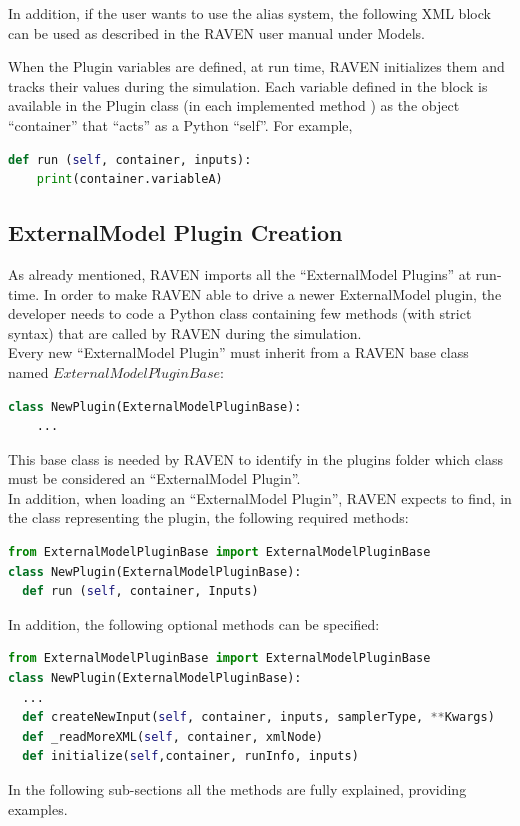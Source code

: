In addition, if the user wants to use the alias system, the following XML block can be used as
described in the RAVEN user manual under Models.

When the Plugin variables are defined, at run time, RAVEN initializes
them and tracks their values during the simulation.
%
Each variable defined in the  block is available in the
Plugin class (in each implemented method ) as the object ``container'' that ``acts''
as a Python ``self''. For example,
\begin{lstlisting}[language=python]
  def run (self, container, inputs):
    print(container.variableA)
\end{lstlisting}

\subsection{ExternalModel Plugin Creation}
\label{subsec:externalModelPluginCreation}
As already mentioned, RAVEN imports all the ``ExternalModel Plugins'' at run-time.
In order to make RAVEN
able to drive a newer ExternalModel plugin, the developer needs to code a Python class
containing few methods (with strict syntax) that are called by RAVEN during the simulation.
\\ Every new ``ExternalModel Plugin'' must inherit from a RAVEN base class named
$ExternalModelPluginBase$:
\begin{lstlisting}[language=python]
  class NewPlugin(ExternalModelPluginBase):
    ...
\end{lstlisting}
This base class is needed by RAVEN to identify in the plugins folder which class must
be considered an  ``ExternalModel Plugin''.
\\ In addition, when loading an ``ExternalModel Plugin'', RAVEN expects to find, in the class representing the plugin,
 the following required methods:
\begin{lstlisting}[language=python]
from ExternalModelPluginBase import ExternalModelPluginBase
class NewPlugin(ExternalModelPluginBase):
  def run (self, container, Inputs)
\end{lstlisting}
In addition, the following optional methods can be specified:
\begin{lstlisting}[language=python]
from ExternalModelPluginBase import ExternalModelPluginBase
class NewPlugin(ExternalModelPluginBase):
  ...
  def createNewInput(self, container, inputs, samplerType, **Kwargs)
  def _readMoreXML(self, container, xmlNode)
  def initialize(self,container, runInfo, inputs)
\end{lstlisting}
In the following sub-sections all the methods are fully explained, providing examples.
